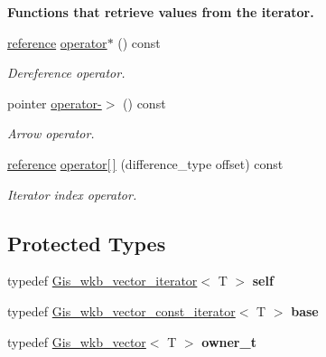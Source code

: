 \begin{Indent}\textbf{ Functions that retrieve values from the iterator.}\par
\begin{DoxyCompactItemize}
\item 
\mbox{\hyperlink{classGis__wkb__vector__const__iterator_a320ffe7a48e9c6440eb76d321ff8c5a2}{reference}} \mbox{\hyperlink{classGis__wkb__vector__iterator_a53a06c139570074e15bdd5bfdbb06878}{operator$\ast$}} () const
\begin{DoxyCompactList}\small\item\em Dereference operator. \end{DoxyCompactList}\item 
pointer \mbox{\hyperlink{classGis__wkb__vector__iterator_a7ac69ef71d2ffff73e024a86ce68c679}{operator-\/$>$}} () const
\begin{DoxyCompactList}\small\item\em Arrow operator. \end{DoxyCompactList}\item 
\mbox{\hyperlink{classGis__wkb__vector__const__iterator_a320ffe7a48e9c6440eb76d321ff8c5a2}{reference}} \mbox{\hyperlink{classGis__wkb__vector__iterator_ad01cffdabb26e97f3024db61e24b6702}{operator\mbox{[}$\,$\mbox{]}}} (difference\+\_\+type offset) const
\begin{DoxyCompactList}\small\item\em Iterator index operator. \end{DoxyCompactList}\end{DoxyCompactItemize}
\end{Indent}
\subsection*{Protected Types}
\begin{DoxyCompactItemize}
\item 
\mbox{\label{classGis__wkb__vector__iterator_a4d5575d2c3c10d829aa79e970d27e792}} 
typedef \mbox{\hyperlink{classGis__wkb__vector__iterator}{Gis\+\_\+wkb\+\_\+vector\+\_\+iterator}}$<$ T $>$ {\bfseries self}
\item 
\mbox{\label{classGis__wkb__vector__iterator_a969de026d431b466555ed4d4f74ef193}} 
typedef \mbox{\hyperlink{classGis__wkb__vector__const__iterator}{Gis\+\_\+wkb\+\_\+vector\+\_\+const\+\_\+iterator}}$<$ T $>$ {\bfseries base}
\item 
\mbox{\label{classGis__wkb__vector__iterator_a9c64c32c7b81c2bed4bad4193d862b92}} 
typedef \mbox{\hyperlink{classGis__wkb__vector}{Gis\+\_\+wkb\+\_\+vector}}$<$ T $>$ {\bfseries owner\+\_\+t}
\end{DoxyCompactItemize}
